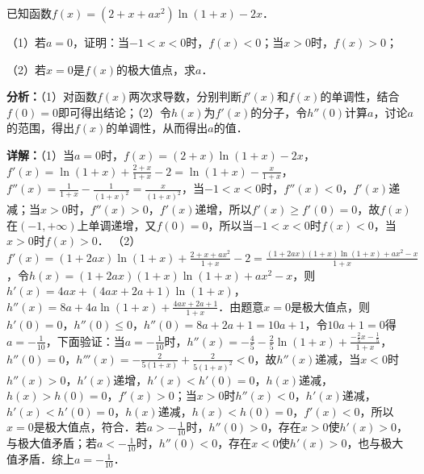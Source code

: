 \begin{question}[points=12]
已知函数$f(x)=(2+x+ax^2)\ln(1+x)-2x$．

（1）若$a=0$，证明：当$-1<x<0$时，$f(x)<0$；当$x>0$时，$f(x)>0$；

（2）若$x=0$是$f(x)$的极大值点，求$a$．
\begin{solution}

\textbf{分析：}（1）对函数$f(x)$两次求导数，分别判断$f'(x)$和$f(x)$的单调性，结合$f(0)=0$即可得出结论；（2）令$h(x)$为$f'(x)$的分子，令$h''(0)$计算$a$，讨论$a$的范围，得出$f(x)$的单调性，从而得出$a$的值．

\textbf{详解：}（1）当$a=0$时，$f(x)=(2+x)\ln(1+x)-2x$，$f'(x)=\ln(1+x)+\frac{2+x}{1+x}-2=\ln(1+x)-\frac{x}{1+x}$，$f''(x)=\frac{1}{1+x}-\frac{1}{(1+x)^2}=\frac{x}{(1+x)^2}$，当$-1<x<0$时，$f''(x)<0$，$f'(x)$递减；当$x>0$时，$f''(x)>0$，$f'(x)$递增，所以$f'(x)\geq f'(0)=0$，故$f(x)$在$(-1,+\infty)$上单调递增，又$f(0)=0$，所以当$-1<x<0$时$f(x)<0$，当$x>0$时$f(x)>0$．
（2）$f'(x)=(1+2ax)\ln(1+x)+\frac{2+x+ax^2}{1+x}-2=\frac{(1+2ax)(1+x)\ln(1+x)+ax^2-x}{1+x}$，令$h(x)=(1+2ax)(1+x)\ln(1+x)+ax^2-x$，则$h'(x)=4ax+(4ax+2a+1)\ln(1+x)$，$h''(x)=8a+4a\ln(1+x)+\frac{4ax+2a+1}{1+x}$．由题意$x=0$是极大值点，则$h'(0)=0$，$h''(0)\leq0$，$h''(0)=8a+2a+1=10a+1$，令$10a+1=0$得$a=-\frac{1}{10}$，下面验证：当$a=-\frac{1}{10}$时，$h''(x)=-\frac{4}{5}-\frac{2}{5}\ln(1+x)+\frac{-\frac{2}{5}x-\frac{1}{5}}{1+x}$，$h''(0)=0$，$h'''(x)=-\frac{2}{5(1+x)}+\frac{2}{5(1+x)^2}<0$，故$h''(x)$递减，当$x<0$时$h''(x)>0$，$h'(x)$递增，$h'(x)<h'(0)=0$，$h(x)$递减，$h(x)>h(0)=0$，$f'(x)>0$；当$x>0$时$h''(x)<0$，$h'(x)$递减，$h'(x)<h'(0)=0$，$h(x)$递减，$h(x)<h(0)=0$，$f'(x)<0$，所以$x=0$是极大值点，符合．若$a>-\frac{1}{10}$时，$h''(0)>0$，存在$x>0$使$h'(x)>0$，与极大值矛盾；若$a<-\frac{1}{10}$时，$h''(0)<0$，存在$x<0$使$h'(x)>0$，也与极大值矛盾．综上$a=-\frac{1}{10}$．
\end{solution}
\end{question}


